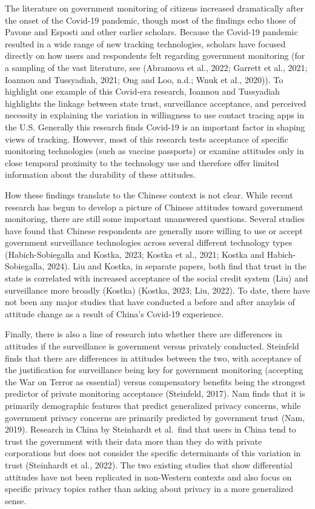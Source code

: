 \documentclass[
  letterpaper,
  DIV=11,
  numbers=noendperiod]{scrartcl}
\begin{document}
The literature on government monitoring of citizens increased
dramatically after the onset of the Covid-19 pandemic, though most of
the findings echo those of Pavone and Esposti and other earlier
scholars. Because the Covid-19 pandemic resulted in a wide range of new
tracking technologies, scholars have focused directly on how users and
respondents felt regarding government monitoring (for a sampling of the
vast literature, see (Abramova et al., 2022; Garrett et al., 2021;
Ioannou and Tussyadiah, 2021; Ong and Loo, n.d.; Wnuk et al., 2020)). To
highlight one example of this Covid-era research, Ioannou and Tussyadiah
highlights the linkage between state trust, surveillance acceptance, and
perceived necessity in explaining the variation in willingness to use
contact tracing apps in the U.S. Generally this research finds Covid-19
is an important factor in shaping views of tracking. However, most of
this research tests acceptance of specific monitoring technologies (such
as vaccine passports) or examine attitudes only in close temporal
proximity to the technology use and therefore offer limited information
about the durability of these attitudes.

How these findings translate to the Chinese context is not clear. While
recent research has begun to develop a picture of Chinese attitudes
toward government monitoring, there are still some important unanswered
questions. Several studies have found that Chinese respondents are
generally more willing to use or accept government surveillance
technologies across several different technology types
(Habich-Sobiegalla and Kostka, 2023; Kostka et al., 2021; Kostka and
Habich-Sobiegalla, 2024). Liu and Kostka, in separate papers, both find
that trust in the state is correlated with increased acceptance of the
social credit system (Liu) and surveillance more broadly (Kostka)
(Kostka, 2023; Liu, 2022). To date, there have not been any major
studies that have conducted a before and after anaylsis of attitude
change as a result of China's Covid-19 experience.

Finally, there is also a line of research into whether there are
differences in attitudes if the surveillance is government versus
privately conducted. Steinfeld finds that there are differences in
attitudes between the two, with acceptance of the justification for
surveillance being key for government monitoring (accepting the War on
Terror as essential) versus compensatory benefits being the strongest
predictor of private monitoring acceptance (Steinfeld, 2017). Nam finds
that it is primarily demographic features that predict generalized
privacy concerns, while government privacy concerns are primarily
predicted by government trust (Nam, 2019). Research in China by
Steinhardt et al.~find that users in China tend to trust the government
with their data more than they do with private corporations but does not
consider the specific determinants of this variation in trust
(Steinhardt et al., 2022). The two existing studies that show
differential attitudes have not been replicated in non-Western contexts
and also focus on specific privacy topics rather than asking about
privacy in a more generalized sense.
\end{document}
